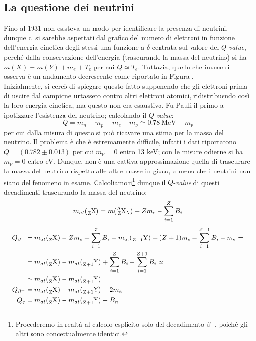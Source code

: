 \subsection{La questione dei neutrini} Fino al 1931 non esisteva un modo per identificare la presenza di neutrini, dunque ci si sarebbe aspettati dal grafico del numero di elettroni in funzione dell'energia cinetica degli stessi una funzione a $\delta$ centrata sul valore del $Q$-\textit{value}, perché dalla conservazione dell'energia (trascurando la massa del neutrino) si ha $m(X) = m(Y) + m_e + T_e$ per cui $Q\simeq T_e$.
Tuttavia, quello che invece si osserva è un andamento decrescente come riportato in Figura .\\
Inizialmente, si cercò di spiegare questo fatto supponendo che gli elettroni prima di uscire dal campione urtassero contro altri elettroni atomici, ridistribuendo così la loro energia cinetica, ma questo non era esaustivo. Fu Pauli il primo a ipotizzare l'esistenza del neutrino; calcolando il $Q$-\textit{value}:
$$Q = m_n - m_p - m_e - m_\nu \simeq 0.78 \;\mbox{MeV} - m_\nu$$
per cui dalla misura di questo si può ricavare una stima per la massa del neutrino. Il problema è che è estremamente difficile, infatti i dati riportarono $Q = (0.782 \pm 0.013)$ per cui $m_\nu =0$ entro 13 keV; con le misure odierne si ha $m_\nu = 0$ entro eV. Dunque, non è una cattiva approssimazione quella di trascurare la massa del neutrino rispetto alle altre masse in gioco, a meno che i neutrini non siano  del fenomeno in esame. Calcoliamoci\footnote{Procederemo in realtà al calcolo esplicito solo del decadimento $\beta^-$, poiché gli altri sono concettualmente identici.} dunque il $Q$-\textit{value} di questi decadimenti trascurando la massa del neutrino:
$$m_{at} (\ce{_{Z}X}) = m(\ce{^A_ZX_N})+Zm_e - \sum_{i=1}^Z B_i$$
\begin{displaymath}
\begin{aligned}
Q_{\beta^-} &= m_{at}(\ce{_ZX}) - Zm_e + \sum_{i=1}^Z B_i - m_{at}(\ce{_{Z+1}Y}) + (Z+1) m_e - \sum_{i=1}^{Z+1} B_i - m_e= \\
&= m_{at}(\ce{_ZX}) - m_{at}(\ce{_{Z+1}Y}) + \sum_{i=1}^Z B_i - \sum_{i=1}^{Z+1} B_i \simeq \\
&\simeq m_{at}(\ce{_ZX}) - m_{at}(\ce{_{Z+1}Y}) \\
Q_{\beta^+} &= m_{at}(\ce{_ZX}) - m_{at}(\ce{_{Z+1}Y}) - 2m_e \\
Q_{\varepsilon} &= m_{at}(\ce{_ZX}) - m_{at}(\ce{_{Z+1}Y}) - B_n
\end{aligned}
\end{displaymath}
